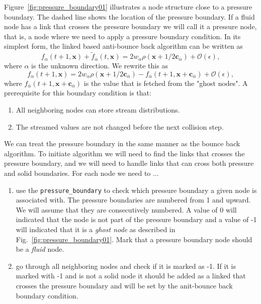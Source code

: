 \documentclass[11pt,a4paper]{report}
\begin{document}
Figure~\ref{fig:pressure_boundary01} illustrates a node structure close to a pressure boundary. The dashed line shows the location of the pressure boundary. If a fluid node has a link that crosses the pressure boundary we will call it a pressure node, that is, a node where we need to apply a pressure boundary condition. In its simplest form, the linked based anti-bounce back algorithm can be written as 
\begin{equation}
f_\alpha(t+1, \mathbf{x}) + \tilde{f}_{\overline{\alpha}}(t, \mathbf{x}) = 2w_\alpha\rho(\mathbf{x}+1/2\mathbf{c}_{\overline{\alpha}}) + \mathcal{O}(\epsilon),
\end{equation}  
where $\alpha$ is the unknown direction. We rewrite this as 
\begin{equation}
f_\alpha(t+1, \mathbf{x}) = 2w_\alpha\rho(\mathbf{x}+1/2\mathbf{c}_{\overline{\alpha}}) - f_{\overline{\alpha}}(t+1, \mathbf{x}+\mathbf{c}_{\overline{\alpha}}) + \mathcal{O}(\epsilon),
\end{equation} 
where $f_{\overline{\alpha}}(t+1, \mathbf{x}+\mathbf{c}_{\overline{\alpha}})$ is the value that is fetched from the "ghost nodes". A prerequisite for this boundary condition is that:  
\begin{enumerate}
	\item All neighboring nodes can store stream distributions.
	\item The streamed values are not changed before the next collision step.
\end{enumerate}
We can treat the pressure boundary in the same manner as the bounce back algorithm. To initiate algorithm we will need to find the links that crosses the pressure boundary, and we will need to handle links that can cross both pressure and solid boundaries. For each node we need to ...
\begin{enumerate}
	\item use the  \texttt{pressure\_boundary} to check which pressure boundary a given node is associated with. The pressure boundaries are numbered from 1 and upward. We will assume that they are consecutively numbered. A value of 0 will indicated that the node is not part of the pressure boundary and a value of -1 will indicated that it is a \emph{ghost node} as described in Fig.~\ref{fig:pressure_boundary01}. Mark that a pressure boundary node should be a \emph{fluid} node.
	\item go through all neighboring nodes and check if it is marked as -1. If it is marked with -1 and is not a solid node it should be added as a linked that crosses the pressure boundary and will be set by the anit-bounce back boundary condition.
\end{enumerate}
\end{document}
